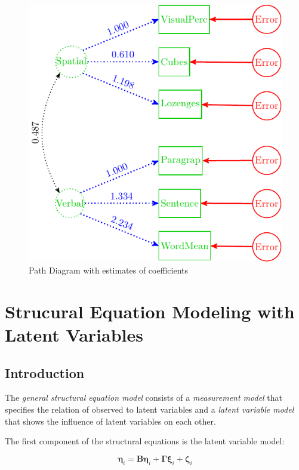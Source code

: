 \begin{figure}[H]

{\centering \includegraphics[width=0.8\linewidth]{images/HSF1Values} 

}

\caption{Path Diagram with estimates of coefficients}\label{fig:HSF1Values}
\end{figure}

\hypertarget{SEM}{%
\chapter{Strucural Equation Modeling with Latent Variables}\label{SEM}}

\hypertarget{introduction-4}{%
\section{Introduction}\label{introduction-4}}


The \emph{general structural equation model} consists of a \emph{measurement model} that specifies the relation of observed to latent variables and a \emph{latent variable model} that
shows the influence of latent variables on each other.

The first component of the structural equations is the latent variable model:


\begin{equation}
\bm{\eta}_{i}=\mathbf{B}\bm{\eta}_{i}+\bm{\Gamma}\bm{\xi}_{i}+\bm{\zeta}_{i}\label{eq:StructuralModel2}
\end{equation}

